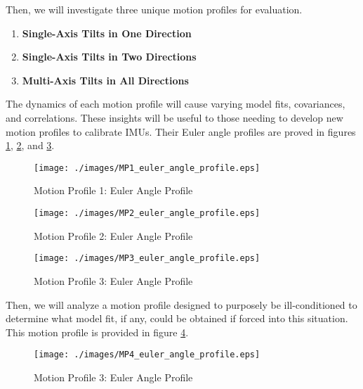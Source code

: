 Then, we will investigate three unique motion profiles for evaluation.

\begin{enumerate}
	\item \textbf{Single-Axis Tilts in One Direction}
	\item \textbf{Single-Axis Tilts in Two Directions}
	\item \textbf{Multi-Axis Tilts in All Directions}
\end{enumerate}
	

The dynamics of each motion profile will cause varying model fits, covariances, and correlations. These insights will be useful to those needing to develop new motion profiles to calibrate IMUs. Their Euler angle profiles are proved in figures \ref{fig: MP1 Euler Angle Profile}, \ref{fig: MP2 Euler Angle Profile}, and \ref{fig: MP3 Euler Angle Profile}.

\begin{figure}[h] 
	\centering
	\texttt{[image: ./images/MP1\_euler\_angle\_profile.eps]}
	\caption{Motion Profile 1: Euler Angle Profile}
	\label{fig: MP1 Euler Angle Profile}
\end{figure}
\FloatBarrier

\begin{figure}[h] 
	\centering
	\texttt{[image: ./images/MP2\_euler\_angle\_profile.eps]}
	\caption{Motion Profile 2: Euler Angle Profile}
	\label{fig: MP2 Euler Angle Profile}
\end{figure}
\FloatBarrier

\begin{figure}[h] 
	\centering
	\texttt{[image: ./images/MP3\_euler\_angle\_profile.eps]}
	\caption{Motion Profile 3: Euler Angle Profile}
	\label{fig: MP3 Euler Angle Profile}
\end{figure}
\FloatBarrier

Then, we will analyze a motion profile designed to purposely be ill-conditioned to determine what model fit, if any, could be obtained if forced into this situation. This motion profile is provided in figure \ref{fig: MP4 Euler Angle Profile}.

\begin{figure}[h] 
	\centering
	\texttt{[image: ./images/MP4\_euler\_angle\_profile.eps]}
	\caption{Motion Profile 3: Euler Angle Profile}
	\label{fig: MP4 Euler Angle Profile}
\end{figure}
\FloatBarrier

